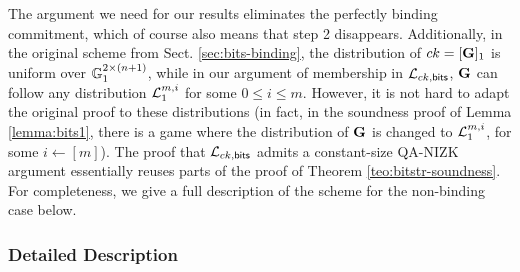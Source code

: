 The argument we need for our results eliminates the perfectly binding commitment, which of course also means that step 2 disappears. Additionally, in the original scheme from Sect. \ref{sec:bits-binding}, the distribution of $ck=[\mathbf{{G}}]_1$ is uniform over $\mathbb{G}_1^{2\times(n+1)}$, while in our argument of membership in 
$\mathcal{L}_{ck,\mathsf{bits}}$, $\mathbf{{G}}$ can follow any distribution $\mathcal{L}_1^{m,i}$ for some $0 \leq i \leq m$. 
However, it is not hard to adapt the original proof to these distributions (in fact, in the soundness proof of 
Lemma \ref{lemma:bits1}, there is a game where the distribution of $\mathbf{{G}}$ is changed to $\mathcal{L}_1^{m,i}$, for some $i \gets [m]$). The proof that $\mathcal{L}_{ck,\mathsf{bits}}$ admits a constant-size QA-NIZK argument essentially reuses parts of the proof of Theorem \ref{teo:bitstr-soundness}. For completeness, we give a full description of the scheme for the non-binding case below. 

\subsubsection{Detailed Description}


